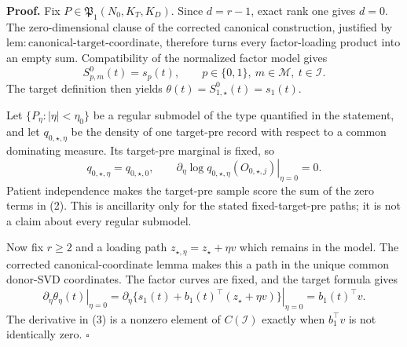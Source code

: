 \textbf{Proof.}
Fix \(P\in\mathfrak P_1(N_0,K_T,K_D)\).  Since \(d=r-1\), exact rank one
gives \(d=0\).  The zero-dimensional clause of the corrected canonical
construction, justified by
\(\mathrm{lem:canonical\mbox{-}target\mbox{-}coordinate}\), therefore
turns every factor-loading product into an empty sum.  Compatibility of the
normalized factor model gives
\[
 S^0_{p,m}(t)=s_p(t),
 \qquad p\in\{0,1\},\ m\in\mathcal M,\ t\in\mathcal I.     \tag{1}
\]
The target definition then yields \(\theta(t)=S^0_{1,\star}(t)=s_1(t)\).

Let \(\{P_\eta:|\eta|<\eta_0\}\) be a regular submodel of the type
quantified in the statement, and let \(q_{0,\star,\eta}\) be the density
of one target-pre record with respect to a common dominating measure.  Its
target-pre marginal is fixed, so
\[
 q_{0,\star,\eta}=q_{0,\star,0},
 \qquad
 \left.\partial_\eta\log q_{0,\star,\eta}
       (O_{0,\star,j})\right|_{\eta=0}=0.                  \tag{2}
\]
Patient independence makes the target-pre sample score the sum of the zero
terms in (2).  This is ancillarity only for the stated fixed-target-pre
paths; it is not a claim about every regular submodel.

Now fix \(r\ge2\) and a loading path
\(z_{\star,\eta}=z_\star+\eta v\) which remains in the model.  The corrected
canonical-coordinate lemma makes this a path in the unique common donor-SVD
coordinates.  The factor curves are fixed, and the target formula gives
\[
 \left.\partial_\eta\theta_\eta(t)\right|_{\eta=0}
 =\left.\partial_\eta
   \{s_1(t)+b_1(t)^\top(z_\star+\eta v)\}\right|_{\eta=0}
 =b_1(t)^\top v.                                           \tag{3}
\]
The derivative in (3) is a nonzero element of \(C(\mathcal I)\) exactly
when \(b_1^\top v\) is not identically zero. \(\square\)